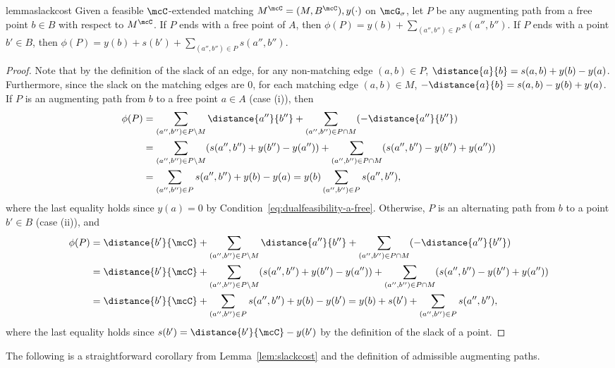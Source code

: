 \begin{restatable}{lemma}{slackcost}
\label{lem:slackcost}
Given a feasible $\mcC$-extended matching $M^{\mcC} = (M, B^{\mcC}),y(\cdot)$ on $\mcG_\sigma$, let $P$ be any augmenting path from a free point $b\in B$ with respect to $M^{\mcC}$. If $P$ ends with a free point of $A$, then $\phi(P) = y(b) +\sum_{(a'',b'') \in P}s(a'',b'')$. If $P$ ends with a point $b' \in B$, then $\phi(P)= y(b) + s(b') + \sum_{(a'',b'') \in P}s(a'',b'')$.  
\end{restatable}
\begin{proof}
    Note that by the definition of the slack of an edge, for any non-matching edge $(a,b)\in P$, $\distance{a}{b} = s(a,b) + y(b)-y(a)$. Furthermore, since the slack on the matching edges are $0$, for each matching edge $(a,b)\in M$, $-\distance{a}{b} = s(a,b) - y(b)+y(a)$. 
    If $P$ is an augmenting path from $b$ to a free point $a\in A$ (case (i)), then
    \begin{align*}
        \phi(P)&=\sum_{(a'',b'')\in P\setminus M} \distance{a''}{b''} + \sum_{(a'',b'')\in P\cap M} (-\distance{a''}{b''})\\&= \sum_{(a'',b'')\in P\setminus M} (s(a'',b'') + y(b'')-y(a'')) + \sum_{(a'',b'')\in P\cap M} (s(a'',b'') - y(b'')+y(a''))\\ &= \sum_{(a'',b'')\in P} s(a'',b'') + y(b) - y(a)=  y(b) \sum_{(a'',b'')\in P} s(a'',b''),
    \end{align*}
    where the last equality holds since $y(a)=0$ by Condition~\eqref{eq:dualfeasibility-a-free}. Otherwise, $P$ is an alternating path from $b$ to a point $b'\in B$ (case (ii)), and 
        \begin{align*}
            \phi(P)&=\distance{b'}{\mcC} + \sum_{(a'',b'')\in P\setminus M} \distance{a''}{b''} + \sum_{(a'',b'')\in P\cap M} (-\distance{a''}{b''})\\&= \distance{b'}{\mcC} + \sum_{(a'',b'')\in P\setminus M} (s(a'',b'') + y(b'')-y(a'')) + \sum_{(a'',b'')\in P\cap M} (s(a'',b'') - y(b'')+y(a''))\\ &= \distance{b'}{\mcC} + \sum_{(a'',b'')\in P} s(a'',b'') + y(b) - y(b')= y(b) + s(b') + \sum_{(a'',b'')\in P} s(a'',b''),
        \end{align*}
        where the last equality holds since $s(b') = \distance{b'}{\mcC} - y(b')$ by the definition of the slack of a point.
\end{proof}

The following is a straightforward corollary from Lemma~\ref{lem:slackcost} and the definition of admissible augmenting paths.


